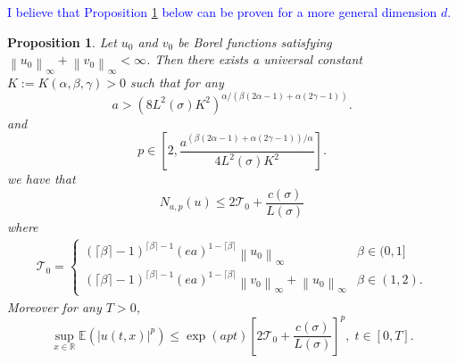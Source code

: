 \documentclass[a4paper,11pt]{article}
\numberwithin{equation}{section}
\theoremstyle{plain}
\newtheorem{proposition}[theorem]{Proposition}
\theoremstyle{definition}
\newcommand{\Norm}[1]{\left\|  #1   \right\|}
\newcommand{\R}{\mathbb{R}}
\numberwithin{NQ}{section}
\numberwithin{LQ}{section}
\numberwithin{ZQ}{section}
\begin{document}
\textcolor{blue}{I believe that Proposition \ref{P:N(u)Bdd} below can be proven for a more general dimension $d$.}
	
	\begin{proposition}{\normalfont\cite[Proposition 3.2]{SoleMillet2021}}
	\label{P:N(u)Bdd}
Let $u_0$ and $v_0$ be Borel functions satisfying $\Norm{u_0}_\infty + \Norm{v_0}_\infty < \infty$. Then there exists a universal constant $K:=K(\alpha, \beta, \gamma) >0$ such that for any 
	\[
		a > \left( 8 L^2(\sigma)K^2\right)^{\alpha/(\beta(2\alpha-1)+\alpha(2\gamma -1))}.
	\]
and 
	\[
		p \in \left[ 2, \frac{a^{(\beta(2\alpha-1)+\alpha(2\gamma-1))/\alpha}}{4L^2(\sigma)K^2} \right].
	\]
we have that 
	\begin{equation}
	\label{E:Nbdd}
		N_{a,p}(u)  \le 2 \mathcal{T}_0 +  \frac{c(\sigma)}{L(\sigma)}
	\end{equation}	
where
	\begin{align*}
		\mathcal{T}_0 = \begin{cases} 
		(\lceil \beta \rceil - 1)^{\lceil \beta \rceil -1}(ea)^{1-\lceil \beta \rceil} \Norm{u_0}_\infty  & \beta \in (0,1]
		\\ (\lceil \beta \rceil - 1)^{\lceil \beta \rceil -1}(ea)^{1-\lceil \beta \rceil} \Norm{v_0}_\infty + \Norm{u_0}_\infty & \beta \in (1,2).
		\end{cases} 
	\end{align*}
Moreover for any $T>0$,
	\begin{equation}
	\label{E:Pnormtbdd}
		\sup_{x\in\R} \mathbb{E}(|u(t,x)|^p) \le \exp\left( a p t  \right) \left[ 2 \mathcal{T}_0 + \frac{ c(\sigma) }{L(\sigma)} \right]^p, \; t\in[0,T].
	\end{equation}
	\end{proposition}
\end{document}

